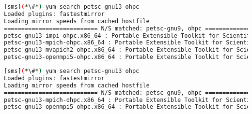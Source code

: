 \begin{lstlisting}[language=bash,keywords={}]
[sms](*\#*) yum search petsc-gnu13 ohpc
Loaded plugins: fastestmirror
Loading mirror speeds from cached hostfile
=========================== N/S matched: petsc-gnu9, ohpc ===========================
petsc-gnu13-impi-ohpc.x86_64 : Portable Extensible Toolkit for Scientific Computation
petsc-gnu13-mpich-ohpc.x86_64 : Portable Extensible Toolkit for Scientific Computation
petsc-gnu13-mvapich2-ohpc.x86_64 : Portable Extensible Toolkit for Scientific Computation
petsc-gnu13-openmpi5-ohpc.x86_64 : Portable Extensible Toolkit for Scientific Computation
\end{lstlisting}
\fi

\begin{lstlisting}[language=bash,keywords={}]
[sms](*\#*) yum search petsc-gnu13 ohpc
Loaded plugins: fastestmirror
Loading mirror speeds from cached hostfile
=========================== N/S matched: petsc-gnu9, ohpc ===========================
petsc-gnu13-mpich-ohpc.x86_64 : Portable Extensible Toolkit for Scientific Computation
petsc-gnu13-openmpi5-ohpc.x86_64 : Portable Extensible Toolkit for Scientific Computation
\end{lstlisting}
\fi

